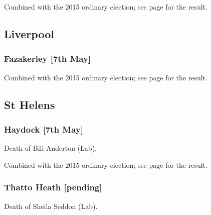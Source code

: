 \documentclass[a4paper,openany]{book}
\begin{document}
\begin{resultsiii}
Combined with the 2015 ordinary election; see page \pageref{HalewoodWestKnowsley} for the result.

\subsection*{Liverpool}

\subsubsection*{Fazakerley \hspace*{\fill}\nolinebreak[1]%
\enspace\hspace*{\fill}
[7th May]}



Combined with the 2015 ordinary election; see page \pageref{FazakerleyLiverpool} for the result.

\subsection*{St Helens}

\subsubsection*{Haydock \hspace*{\fill}\nolinebreak[1]%
\enspace\hspace*{\fill}
[7th May]}


Death of Bill Anderton (Lab).

Combined with the 2015 ordinary election; see page \pageref{HaydockStHelens} for the result.

\subsubsection*{Thatto Heath \hspace*{\fill}\nolinebreak[1]%
\enspace\hspace*{\fill}
[pending]}


Death of Sheila Seddon (Lab).


\end{resultsiii}
\end{document}
